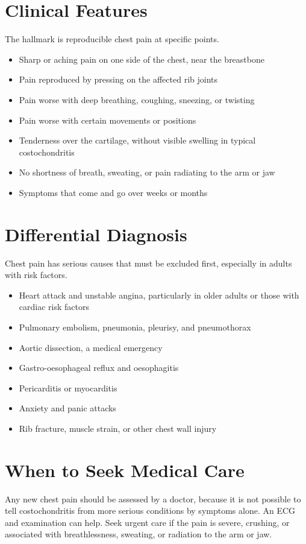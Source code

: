 \section*{Clinical Features}
The hallmark is reproducible chest pain at specific points.

\begin{itemize}
    \item Sharp or aching pain on one side of the chest, near the breastbone
    \item Pain reproduced by pressing on the affected rib joints
    \item Pain worse with deep breathing, coughing, sneezing, or twisting
    \item Pain worse with certain movements or positions
    \item Tenderness over the cartilage, without visible swelling in typical costochondritis
    \item No shortness of breath, sweating, or pain radiating to the arm or jaw
    \item Symptoms that come and go over weeks or months
\end{itemize}

\section*{Differential Diagnosis}
Chest pain has serious causes that must be excluded first, especially in adults with risk factors.

\begin{itemize}
    \item Heart attack and unstable angina, particularly in older adults or those with cardiac risk factors
    \item Pulmonary embolism, pneumonia, pleurisy, and pneumothorax
    \item Aortic dissection, a medical emergency
    \item Gastro-oesophageal reflux and oesophagitis
    \item Pericarditis or myocarditis
    \item Anxiety and panic attacks
    \item Rib fracture, muscle strain, or other chest wall injury
\end{itemize}

\section*{When to Seek Medical Care}
Any new chest pain should be assessed by a doctor, because it is not possible to tell costochondritis from more serious conditions by symptoms alone. An ECG and examination can help. Seek urgent care if the pain is severe, crushing, or associated with breathlessness, sweating, or radiation to the arm or jaw.

